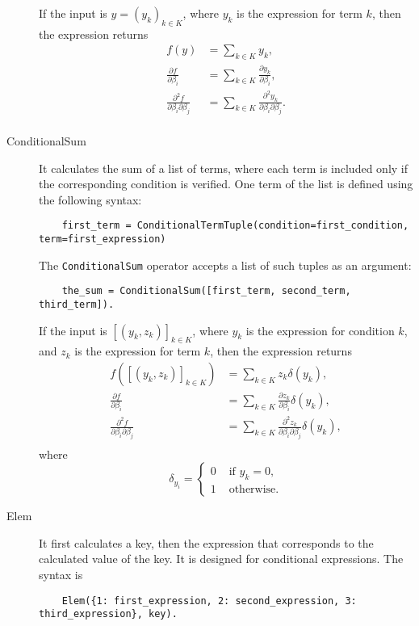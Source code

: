 \documentclass[12pt,a4paper]{article}
\begin{document}
\begin{description}
  If the input is $y=(y_k)_{k\in K}$, where $y_k$ is the expression for  term $k$, then the expression returns
  \begin{align*}
    f(y) &= \sum_{k\in K} y_k, \\
    \frac{\partial f}{\partial \beta_i} &= \sum_{k\in K} \frac{\partial y_k}{\partial \beta_i}, \\
    \frac{\partial^2 f}{\partial \beta_i \partial \beta_j} &= \sum_{k\in K} \frac{\partial^2 y_k}{\partial \beta_i \partial \beta_j}. \\
  \end{align*}
\item[ConditionalSum] It calculates the sum of a list of terms, where each term is included only if the corresponding condition is verified. One term of the list is defined using the following syntax:
  \begin{lstlisting}
    first_term = ConditionalTermTuple(condition=first_condition, term=first_expression)
  \end{lstlisting}
  The \lstinline+ConditionalSum+ operator accepts a list of such tuples as an argument:
  \begin{lstlisting}
    the_sum = ConditionalSum([first_term, second_term, third_term]).
  \end{lstlisting}
  If the input is $[(y_k, z_k)]_{k\in K}$, where $y_k$ is the expression for condition $k$, and $z_k$ is the expression for  term $k$, then the expression returns
  \begin{align*}
  f([(y_k, z_k)]_{k\in K}) &= \sum_{k\in K} z_k \delta(y_k), \\
  \frac{\partial f}{\partial \beta_i} &= \sum_{k\in K} \frac{\partial z_k}{\partial \beta_i} \delta(y_k), \\
  \frac{\partial^2 f}{\partial \beta_i \partial \beta_j} &= \sum_{k\in K} \frac{\partial^2 z_k}{\partial \beta_i \partial \beta_j} \delta(y_k), \\
  \end{align*}
  where
  \[
  \delta_{y_i} = \left\{
  \begin{aligned}
    0 & \text{ if } y_k = 0, \\
    1 & \text{ otherwise.}
  \end{aligned}
  \right.
  \]
\item[Elem] It first calculates a key, then the expression that corresponds to the calculated value of the key. It is designed for conditional expressions. The syntax is
  \begin{lstlisting}
    Elem({1: first_expression, 2: second_expression, 3: third_expression}, key).

\end{lstlisting}
\end{description}
\end{document}
